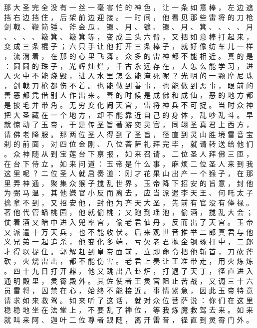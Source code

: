 {那 大 圣 完 全 没 有 一 丝 一 毫 害 怕 的 神 色 ， 让 一 条 如 意 棒 ， 左 边 遮 挡 右 边 挡 住 ， 后 架 前 边 迎 接 。
一 时 间 ， 他 看 见 那 些 雷 将 的 刀 枪 剑 戟 、 鞭 简 锤 、 斧 金 瓜 、 镰 、 月 、 镰 、 镰 、 月 、 箕 、 、 、 、 月 、 、 、 、 簸 箕 、 簸 箕 等 ， 变 成 三 头 六 臂 ， 又 把 如 意 棒 打 起 来 ， 变 成 三 条 棍 子 ； 六 只 手 让 他 打 开 三 条 棒 子 ， 就 好 像 纺 车 儿 一 样 ， 流 淌 着 ， 在 那 的 心 里 飞 舞 。
众 多 的 雷 神 都 不 能 相 近 。
真 的 是 ： 圆 圆 的 珠 子 ， 光 辉 灿 烂 ， 千 古 永 远 存 在 ， 人 怎 么 能 学 习 ， 进 入 火 中 不 能 烧 毁 ， 进 入 水 里 怎 么 能 淹 死 呢 ？ 光 明 的 一 颗 摩 尼 珠 ， 剑 戟 刀 枪 都 伤 不 着 。
也 能 做 到 善 事 ， 也 能 做 到 恶 事 ， 眼 前 的 善 恶 都 凭 借 别 人 作 出 来 。
善 的 时 候 是 成 佛 和 成 仙 ， 恶 的 地 方 都 是 披 毛 并 带 角 。
无 穷 变 化 闹 天 宫 ， 雷 将 神 兵 不 可 捉 。
当 时 众 神 把 大 圣 藏 在 一 个 地 方 ， 却 不 能 靠 近 自 己 的 身 体 ， 乱 吵 乱 斗 。
早 就 惊 动 了 玉 帝 ， 于 是 传 圣 旨 著 游 奕 灵 官 ， 同 翊 圣 真 君 上 西 方 ， 请 佛 老 降 服 。
那 两 位 圣 人 得 到 了 圣 旨 ， 径 直 到 灵 山 胜 境 雷 音 宝 刹 的 前 面 ， 对 四 位 金 刚 、 八 位 菩 萨 礼 拜 完 毕 ， 就 请 转 送 给 他 们 。
众 神 随 从 到 宝 莲 台 下 禀 报 ， 如 来 召 请 。
二 位 圣 人 拜 佛 三 匝 ， 在 台 下 侍 立 。
如 来 问 道 ： 玉 帝 是 什 么 事 ， 麻 烦 二 位 圣 人 来 到 我 这 里 呢 ？ 二 位 圣 人 就 启 奏 道 ： 刚 才 花 果 山 出 产 一 个 猴 子 ， 在 那 里 弄 神 通 ， 聚 集 众 猴 子 搅 乱 世 界 。
玉 帝 降 下 招 安 的 旨 意 ， 封 他 为 弼 马 温 ， 其 他 嫌 官 小 反 而 离 去 。
应 当 派 遣 李 天 王 、 何 吒 太 子 擒 拿 不 到 ， 又 招 安 他 ， 封 他 为 齐 天 大 圣 ， 先 前 有 官 没 有 俸 禄 。
著 他 代 管 蟠 桃 园 ， 他 就 偷 桃 ； 又 跑 到 瑶 池 ， 偷 酒 ， 搅 乱 大 会 ； 仗 着 酒 又 暗 中 进 入 兜 率 宫 ， 偷 老 君 仙 丹 ， 反 而 出 了 天 宫 。
玉 帝 又 派 遣 十 万 天 兵 ， 也 不 能 收 伏 。
后 来 观 世 音 推 举 二 郎 真 君 与 他 义 兄 弟 一 起 追 杀 ， 他 变 化 多 端 ， 亏 欠 老 君 抛 金 钢 琢 打 中 ， 二 郎 才 得 以 捉 住 。
郭 解 赶 到 皇 帝 面 前 ， 立 即 命 令 把 他 斩 首 ， 刀 砍 斧 砍 ， 火 烧 雷 击 ， 都 不 能 伤 害 。
老 君 上 奏 让 王 准 带 走 ， 用 火 炼 炼 。
四 十 九 日 打 开 鼎 ， 他 又 跳 出 八 卦 炉 ， 打 退 了 天 丁 ， 径 直 进 入 通 明 殿 里 ， 灵 霄 殿 外 。
其 佐 使 者 王 灵 官 阻 止 苦 战 ， 又 调 三 十 六 员 雷 将 ， 囚 禁 在 心 ， 始 终 不 能 接 近 。
事 情 紧 急 ， 因 此 玉 帝 特 意 请 求 如 来 救 驾 。
如 来 听 了 这 话 ， 就 对 众 位 菩 萨 说 ： 你 们 在 这 里 稳 稳 地 坐 在 法 堂 上 ， 不 要 乱 了 禅 位 ， 等 我 炼 魔 救 驾 去 来 。
如 来 就 叫 来 阿 、 迦 叶 二 位 尊 者 跟 随 ， 离 开 雷 音 ， 径 直 到 灵 霄 门 外 。
}
